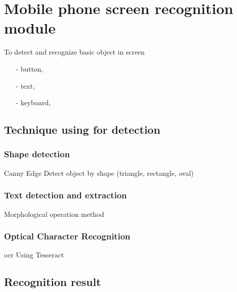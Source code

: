 \chapter{Mobile phone screen recognition module}
To detect and recognize basic object in screen
\begin{itemize}
	\item[-] button,
	\item[-] text,
	\item[-] keyboard,
\end{itemize}

\section{Technique using for detection}
\subsection{Shape detection}
Canny Edge
Detect object by shape (triangle, rectangle, oval)

\subsection{Text detection and extraction}
Morphological operation method

\subsection{Optical Character Recognition}
\gls{ocr}
Using Tesseract

\section{Recognition result}
